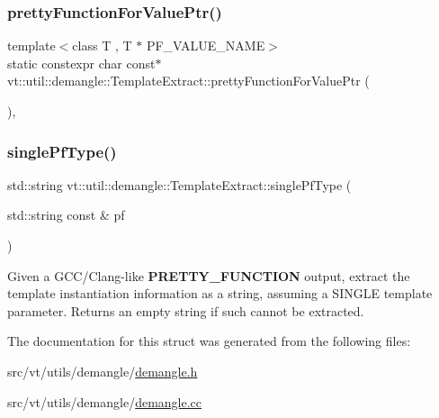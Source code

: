 \subsubsection{\texorpdfstring{pretty\+Function\+For\+Value\+Ptr()}{prettyFunctionForValuePtr()}}
{\footnotesize\ttfamily template$<$class T , T $\ast$ P\+F\+\_\+\+V\+A\+L\+U\+E\+\_\+\+N\+A\+ME$>$ \\
static constexpr char const$\ast$ vt\+::util\+::demangle\+::\+Template\+Extract\+::pretty\+Function\+For\+Value\+Ptr (\begin{DoxyParamCaption}{ }\end{DoxyParamCaption})\hspace{0.3cm}{\ttfamily [inline]}, {\ttfamily [static]}}

\mbox{\label{structvt_1_1util_1_1demangle_1_1_template_extract_a5b76d8ad80e5054d4da8bea682a1752d}} 
\subsubsection{\texorpdfstring{single\+Pf\+Type()}{singlePfType()}}
{\footnotesize\ttfamily std\+::string vt\+::util\+::demangle\+::\+Template\+Extract\+::single\+Pf\+Type (\begin{DoxyParamCaption}\item[{std\+::string const \&}]{pf }\end{DoxyParamCaption})\hspace{0.3cm}{\ttfamily [static]}}

Given a G\+C\+C/\+Clang-\/like {\bfseries P\+R\+E\+T\+T\+Y\+\_\+\+F\+U\+N\+C\+T\+I\+ON} output, extract the template instantiation information as a string, assuming a S\+I\+N\+G\+LE template parameter. Returns an empty string if such cannot be extracted. 

The documentation for this struct was generated from the following files\+:\begin{DoxyCompactItemize}
\item 
src/vt/utils/demangle/\hyperlink{demangle_8h}{demangle.\+h}\item 
src/vt/utils/demangle/\hyperlink{demangle_8cc}{demangle.\+cc}\end{DoxyCompactItemize}
